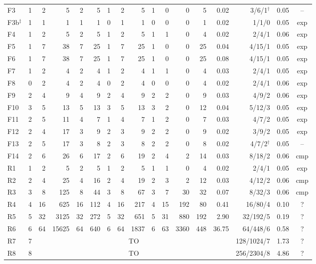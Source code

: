 \begin{table}[t]
\begin{tabular}{@{}lrrrrrrrrrrrrrrrc@{}}
F3 & 1 & 2 & 5 & 2 & 5 & 1 & 2 & 5 & 1 & 0 & 0 & 5 & 0.02 & 3/6/1$^\dagger$ & 0.05 & --\\
F3b$^\ddagger$ & 1 & 1 & 1 & 1 & 1 & 0 & 1 & 1 & 0 & 0 & 0 & 1 & 0.02 & 1/1/0 & 0.05 & exp\\
F4 & 1 & 2 & 5 & 2 & 5 & 1 & 2 & 5 & 1 & 1 & 0 & 4 & 0.02 & 2/4/1 & 0.06 & exp\\
F5 & 1 & 7 & 38 & 7 & 25 & 1 & 7 & 25 & 1 & 0 & 0 & 25 & 0.04 & 4/15/1 & 0.05 & exp\\
F6 & 1 & 7 & 38 & 7 & 25 & 1 & 7 & 25 & 1 & 0 & 0 & 25 & 0.08 & 4/15/1 & 0.05 & exp\\
F7 & 1 & 2 & 4 & 2 & 4 & 1 & 2 & 4 & 1 & 1 & 0 & 4 & 0.03 & 2/4/1 & 0.05 & exp\\
F8 & 0 & 2 & 4 & 2 & 4 & 0 & 2 & 4 & 0 & 0 & 0 & 4 & 0.02 & 2/4/1 & 0.06 & exp\\
F9 & 2 & 4 & 9 & 4 & 9 & 2 & 4 & 9 & 2 & 2 & 0 & 9 & 0.03 & 4/9/2 & 0.06 & exp\\
F10 & 3 & 5 & 13 & 5 & 13 & 3 & 5 & 13 & 3 & 2 & 0 & 12 & 0.04 & 5/12/3 & 0.05 & exp\\
F11 & 2 & 5 & 11 & 4 & 7 & 1 & 4 & 7 & 1 & 2 & 0 & 7 & 0.03 & 4/7/2 & 0.05 & exp\\
F12 & 2 & 4 & 17 & 3 & 9 & 2 & 3 & 9 & 2 & 2 & 0 & 9 & 0.02 & 3/9/2 & 0.05 & exp\\
F13 & 2 & 5 & 17 & 3 & 8 & 2 & 3 & 8 & 2 & 2 & 0 & 8 & 0.02 & 4/7/2$^\dagger$ & 0.05 & --\\
F14 & 2 & 6 & 26 & 6 & 17 & 2 & 6 & 19 & 2 & 4 & 2 & 14 & 0.03 & 8/18/2 & 0.06 & cmp\\
R1 & 1 & 2 & 5 & 2 & 5 & 1 & 2 & 5 & 1 & 1 & 0 & 4 & 0.02 & 2/4/1 & 0.05 & exp\\
R2 & 2 & 4 & 25 & 4 & 16 & 2 & 4 & 19 & 2 & 3 & 2 & 12 & 0.03 & 4/12/2 & 0.06 & cmp\\
R3 & 3 & 8 & 125 & 8 & 44 & 3 & 8 & 67 & 3 & 7 & 30 & 32 & 0.07 & 8/32/3 & 0.06 & cmp\\
R4 & 4 & 16 & 625 & 16 & 112 & 4 & 16 & 217 & 4 & 15 & 192 & 80 & 0.41 & 16/80/4 & 0.10 & ?\\
R5 & 5 & 32 & 3125 & 32 & 272 & 5 & 32 & 651 & 5 & 31 & 880 & 192 & 2.90 & 32/192/5 & 0.19 & ?\\
R6 & 6 & 64 & 15625 & 64 & 640 & 6 & 64 & 1837 & 6 & 63 & 3360 & 448 & 36.75 & 64/448/6 & 0.58 & ?\\
R7 & 7 & \multicolumn{12}{c}{TO} & 128/1024/7 & 1.73 & ?\\
R8 & 8 & \multicolumn{12}{c}{TO} & 256/2304/8 & 4.86 & ?\\

\end{tabular}
\end{table}
